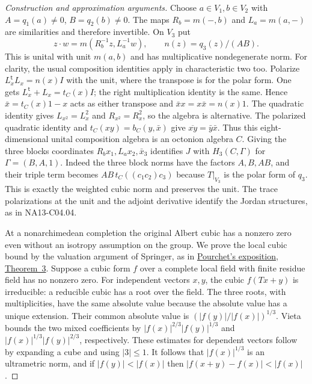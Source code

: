 \documentclass[11pt,a4paper,openany,oneside]{book}
\theoremstyle{resultstyle}
\theoremstyle{definition}
\numberwithin{equation}{chapter}
\begin{document}
\begin{proof}[Construction and approximation arguments]
Choose \(a\in V_1,b\in V_2\) with
\(A=q_1(a)\ne0\), \(B=q_2(b)\ne0\).
The maps \(R_b=m(-,b)\) and \(L_a=m(a,-)\)
are similarities and therefore invertible.
On \(V_3\) put
\[
 z\cdot w=m(R_b^{-1}z,L_a^{-1}w),
 \qquad n(z)=q_3(z)/(AB).
\]
This is unital with unit \(m(a,b)\)
and has multiplicative nondegenerate
norm. For clarity, the usual
composition identities apply in
characteristic two too. Polarize
\(L_x^{\mathsf t}L_x=n(x)I\) with the unit,
where the transpose is for the polar
form. One gets \(L_x^{\mathsf t}+L_x=t_C(x)I\);
the right multiplication identity is the
same. Hence \(\bar x=t_C(x)1-x\) acts
as either transpose and
\(\bar x x=x\bar x=n(x)1\).
The quadratic identity gives
\(L_{x^2}=L_x^2\) and \(R_{x^2}=R_x^2\),
so the algebra is alternative. The
polarized quadratic identity and
\(t_C(xy)=b_C(y,\bar x)\) give
\(\overline{xy}=\bar y\bar x\).
Thus
this eight-dimensional unital
composition algebra is an octonion
algebra \(C\). Giving the three
blocks coordinates \(R_b x_1,L_a x_2,\bar x_3\)
identifies \(J\) with \(H_3(C,\Gamma)\)
for \(\Gamma=(B,A,1)\). Indeed the
three block norms have the factors
\(A,B,AB\), and their triple term
becomes \(AB\,t_C((c_1c_2)c_3)\)
because \(T|_{V_3}\) is the polar form
of \(q_3\). This is exactly the
weighted cubic norm and preserves
the unit. The trace polarizations
at the unit and the adjoint derivative
identify the Jordan structures,
as in NA13-C04.04.

At a nonarchimedean completion the original
Albert cubic has a nonzero zero even without an
isotropy assumption on the group. We prove the
local cubic bound by the valuation argument of
Springer, as in
\href{https://www.numdam.org/item/SDPP_1965-1966__7_2_A6_0/}
{Pourchet's exposition, Theorem~3}.
Suppose a cubic form \(f\) over a complete local
field with finite residue field has no nonzero
zero. For independent vectors \(x,y\), the cubic
\(f(Tx+y)\) is irreducible: a reducible cubic has
a root over the field. The three roots, with
multiplicities, have the same absolute value
because the absolute value has a unique extension.
Their common absolute value is
\((|f(y)|/|f(x)|)^{1/3}\). Vieta bounds the two
mixed coefficients by
\(|f(x)|^{2/3}|f(y)|^{1/3}\) and
\(|f(x)|^{1/3}|f(y)|^{2/3}\), respectively.
These estimates for dependent vectors follow
by expanding a cube and using \(|3|\leq1\).
It follows that \(|f(x)|^{1/3}\) is an
ultrametric norm, and if \(|f(y)|<|f(x)|\)
then \(|f(x+y)-f(x)|<|f(x)|\).


\end{proof}
\end{document}
